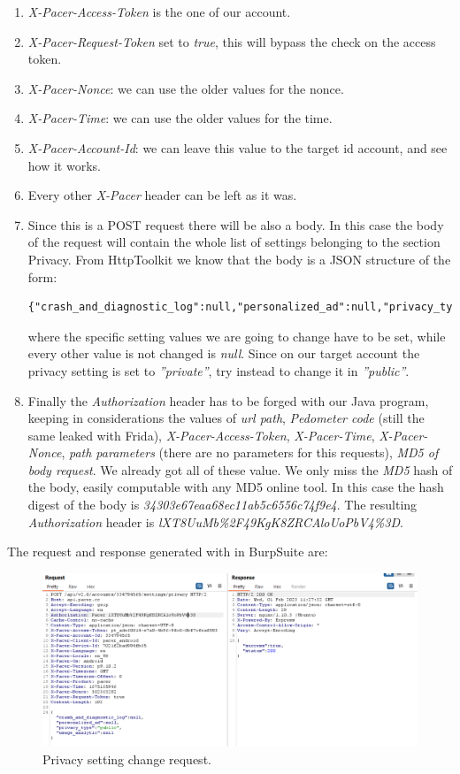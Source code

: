 			\begin{enumerate}
				\item \textit{X-Pacer-Access-Token} is the one of our account.
				\item \textit{X-Pacer-Request-Token} set to \textit{true}, this will bypass the check on the access token.
				\item \textit{X-Pacer-Nonce}: we can use the older values for the nonce.
				\item \textit{X-Pacer-Time}: we can use the older values for the time.
				\item \textit{X-Pacer-Account-Id}: we can leave this value to the target id account, and see how it works.
				\item Every other \textit{X-Pacer} header can be left as it was.
				\item Since this is a POST request there will be also a body. In this case the body of the request will contain the whole list of settings belonging to the section Privacy. From HttpToolkit we know that the body is a JSON structure of the form:
\begin{lstlisting}
{"crash_and_diagnostic_log":null,"personalized_ad":null,"privacy_type":"public","usage_analytic":null}
\end{lstlisting}
				\par where the specific setting values we are going to change have to be set, while every other value is not changed is \textit{null}. Since on our target account the privacy setting is set to \textit{''private''},	try instead to change it in \textit{''public''}.
				\item Finally the \textit{Authorization} header has to be forged with our Java program, keeping in considerations the values of \textit{url path}, \textit{Pedometer code} (still the same leaked with Frida), \textit{X-Pacer-Access-Token}, \textit{X-Pacer-Time}, \textit{X-Pacer-Nonce}, \textit{path parameters} (there are no parameters for this requests), \textit{MD5 of body request}. We already got all of these value. We only miss the \textit{MD5} hash of the body, easily computable with any MD5 online tool. In this case the hash digest of the body is \textit{34303e67eaa68ec11ab5c6556c74f9e4}. The resulting \textit{Authorization} header is \textit{lXT8UuMb\%2F49KgK8ZRCAloUoPbV4\%3D}.
			\end{enumerate}
			\par The request and response generated with in BurpSuite are:\newpage
			\begin{figure}[ht]
				\centering
				\includegraphics[width=\textwidth]{images/pacer_privacy.png}
				\caption{Privacy setting change request.}
			\end{figure}
